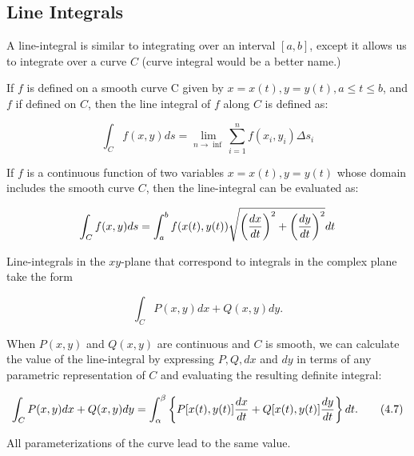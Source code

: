 \documentclass{article}
\begin{document}
\subsection{Line Integrals}

\begin{note}
A \@{line-integral} is similar to integrating over an \@{interval} $[a,b]$, except it allows us to integrate over a curve $C$ (curve integral would be a better name.)
\end{note}

\begin{definition}
If $f$ is defined on a \@{smooth} curve C given by $x = x(t), y = y(t), a \le t \le b$, and $f$ if defined on $C$, then the line integral of $f$ along $C$ is defined as:

\[ \int_C f(x,y) ds = \lim_{n \to \inf} \sum_{i=1}^n f(x_i, y_i) \Delta s_i \]
\end{definition}

\begin{theorem}\label{line-integral-over-a-plane-curve}
If $f$ is a \@{continuous} function of two variables $x = x(t), y = y(t)$ whose domain includes the \@{smooth} curve $C$, then the \@{line-integral} can be evaluated as:

\[ \int_C f(x,y) ds = \int_a^b f(x(t), y(t)) \sqrt{ \left(\frac{dx}{dt}\right)^2 + \left(\frac{dy}{dt}\right)^2} dt \]
\end{theorem}

\detach

\begin{remark}
\@{Line-integrals} in the $xy$-plane that correspond to integrals in the complex plane take the form

\[ \int_{C} P(x,y)dx + Q(x,y)dy. \]
\end{remark}

\begin{theorem}\label{all-parameterizations-of-curve-have-same-line-integral}
When $P(x,y)$ and $Q(x,y)$ are \@{continuous} and $C$ is \@{smooth}, we can calculate the value of the \@{line-integral} by expressing $P, Q, dx$ and $dy$ in terms of any parametric representation of $C$ and evaluating the resulting definite integral:

\[ \int_{C} P(x,y)dx + Q(x,y)dy = \int_{\alpha}^{\beta} \left\{ P[x(t), y(t)]\frac{dx}{dt} + Q[x(t), y(t)]\frac{dy}{dt} \right\}dt. \tag{4.7} \]

All parameterizations of the curve lead to the same value.
\end{theorem}
\end{document}
